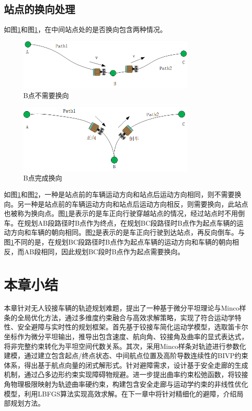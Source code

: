 \documentclass[master,academic]{ysuthesis} %
\begin{document}
		\subsection{站点的换向处理}
		如图\ref{fig:换向1}和图\ref{fig:换向1}，在中间站点处的是否换向包含两种情况。
		\begin{figure}[H]
			\centering
			\includegraphics[width=0.8\textwidth]{换向1.png}
			\caption{B点不需要换向}
			\label{fig:换向1}
		\end{figure}
		\begin{figure}[H]
			\centering
			\includegraphics[width=0.8\textwidth]{换向2.png}
			\caption{B点完成换向}
			\label{fig:换向2}
		\end{figure}

		如图\ref{fig:换向1}和图\ref{fig:换向2}，一种是站点前的车辆运动方向和站点后运动方向相同，则不需要换向。另一种是站点前的车辆运动方向和站点后运动方向相反，则需要换向，此站点也被称为换向点。图\ref{fig:换向1}是表示的是车正向行驶穿越站点的情况，经过站点时不用倒车。在规划AB段路径时B点作为终点，在规划BC段路径时B点作为起点车辆的运动方向和车辆的朝向相同。图\ref{fig:换向2}是表示的是车正向行驶到达站点，再反向倒车。与图\ref{fig:换向1}不同的是，在规划BC段路径时B点作为起点车辆的运动方向和车辆的朝向相反，而AB段相同，因此规划BC段时B点作为起点需要换向。

	\section{本章小结}
	本章针对无人铰接车辆的轨迹规划难题，提出了一种基于微分平坦理论与Minco样条的全局优化方法，通过多维度约束融合与高效求解策略，实现了符合运动学特性、安全避障与实时性的规划框架。首先基于铰接车简化运动学模型，选取笛卡尔坐标作为微分平坦输出，推导出包含速度、航向角、铰接角及曲率的显式表达式，将非完整约束转化为平坦空间代数关系。其次，采用Minco样条对轨迹进行参数化建模，通过建立包含起点/终点状态、中间航点位置及高阶导数连续性的BIVP约束体系，得出基于航点向量的闭式解形式。针对避障需求，设计基于安全走廊的生成机制，通过凸多边形约束实现障碍物规避。进一步提出曲率约束松弛函数，将铰接角物理极限映射为轨迹曲率硬约束，构建包含安全走廊与运动学约束的非线性优化模型，利用LBFGS算法实现高效求解。在下一章中将针对精细化的避障，介绍局部规划方法。
	
\end{document}
